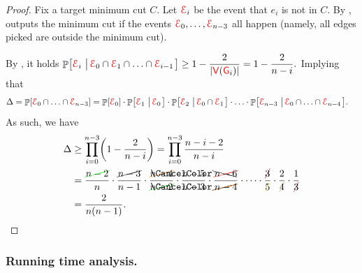\begin{proof}
    Fix a target minimum cut $C$.
    Let ${\textcolor{red}{\EuScript{E}}}_{i}$ be the event that $e_{i}$ is not in $C$.%
    By , \MinCut{} outputs the
    minimum cut if the events ${\textcolor{red}{\EuScript{E}}}_{0},\ldots,{\textcolor{red}{\EuScript{E}}}_{n-3}$ all
    happen (namely, all edges picked are outside the minimum cut).
    
    By , it holds
    \begin{math}
        \displaystyle \Prob{\Event_{i}\sep{ \Event_{0} \cap
              \Event_{1}\cap\ldots\cap\Event_{i-1}}} \geq
        1-\frac{2}{\cardin{\Vertices(\Graph_{i})}} = 1-\frac{2}{n-i}.
    \end{math}
    Implying that
    \begin{align*}
        \Delta%
        &=%
        \Prob{\Event_{0}\cap\ldots\cap\Event_{n-3}}%
        =%
        \Prob{\Event_{0}} \cdot \Prob{\Event_{1}\sep{\Event_{0}}}
        \cdot \Prob{\Event_{2}\sep{\Event_{0}\cap\Event_{1}}} \cdot
        \ldots \cdot \Prob{\Event_{n-3}\sep{
              \Event_{0}\cap\ldots\cap\Event_{n-4}}}.
    \end{align*}
    As such, we have
    \begin{align*}
      \Delta%
      &\geq %
        \prod_{i=0}^{n-3}\pth{1-\frac{2}{n-i}}%
        =%
        \prod_{i=0}^{n-3}\frac{n-i-2}{n-i}%
      \\&%
      =%
      \frac{\CCancel[green]{n-2}}{n}
      \cdot \frac{\Ccancel{n-3}}{n-1}
      \cdot \frac{\Ccancel[orange]{n-4}}{\CCancel[green]{n-2}}%
      \cdot
      \frac{\bcancel{n-5}}{\cancel{n-3}}
      \cdot
      \frac{\Ccancel[red]{n-6}}{\Ccancel[orange]{n-4}}
      \cdot
      \cdots \cdot \frac{\Ccancel[purple]{3}}{\Ccancel[yellow]{5}} \cdot
      \frac{2}{\CCancel[brown]{4}}
      \cdot \frac{1}{\CCancel[purple]{3}}%
      \\&
      =%
      \frac{2}{n (n-1)}.
    \end{align*}
\end{proof}

\subsubsection{Running time analysis.}

